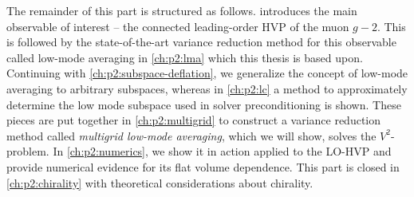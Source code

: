 The remainder of this part is structured as follows.
 introduces the main observable of interest -- the connected leading-order HVP of the muon $g-2$.
This is followed by the state-of-the-art variance reduction method for this observable called low-mode averaging in \cref{ch:p2:lma} which this thesis is based upon.
Continuing with \cref{ch:p2:subspace-deflation}, we generalize the concept of low-mode averaging to arbitrary subspaces, whereas in \cref{ch:p2:lc} a method to approximately determine the low mode subspace used in solver preconditioning is shown.
These pieces are put together in \cref{ch:p2:multigrid} to construct a variance reduction method called \emph{multigrid low-mode averaging}, which we will show, solves the $V^{2}$-problem.
In \cref{ch:p2:numerics}, we show it in action applied to the LO-HVP and provide numerical evidence for its flat volume dependence.
This part is closed in \cref{ch:p2:chirality} with theoretical considerations about chirality.


